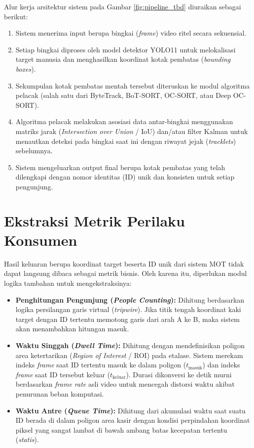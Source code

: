 Alur kerja arsitektur sistem pada Gambar \ref{fig:pipeline_tbd} diuraikan sebagai berikut:
\begin{enumerate}
    \item Sistem menerima input berupa bingkai (\textit{frame}) video ritel secara sekuensial.
    \item Setiap bingkai diproses oleh model detektor YOLO11 untuk melokalisasi target manusia dan menghasilkan koordinat kotak pembatas (\textit{bounding boxes}).
    \item Sekumpulan kotak pembatas mentah tersebut diteruskan ke modul algoritma pelacak (salah satu dari ByteTrack, BoT-SORT, OC-SORT, atau Deep OC-SORT).
    \item Algoritma pelacak melakukan asosiasi data antar-bingkai menggunakan matriks jarak (\textit{Intersection over Union} / IoU) dan/atau filter Kalman untuk menautkan deteksi pada bingkai saat ini dengan riwayat jejak (\textit{tracklets}) sebelumnya.
    \item Sistem mengeluarkan output final berupa kotak pembatas yang telah dilengkapi dengan nomor identitas (ID) unik dan konsisten untuk setiap pengunjung.
\end{enumerate}

\section{Ekstraksi Metrik Perilaku Konsumen}

Hasil keluaran berupa koordinat target beserta ID unik dari sistem MOT tidak dapat langsung dibaca sebagai metrik bisnis. Oleh karena itu, diperlukan modul logika tambahan untuk mengekstraksinya:
\begin{itemize}
    \item \textbf{Penghitungan Pengunjung (\textit{People Counting}):} Dihitung berdasarkan logika persilangan garis virtual (\textit{tripwire}). Jika titik tengah koordinat kaki target dengan ID tertentu memotong garis dari arah A ke B, maka sistem akan menambahkan hitungan masuk.
    \item \textbf{Waktu Singgah (\textit{Dwell Time}):} Dihitung dengan mendefinisikan poligon area ketertarikan (\textit{Region of Interest} / ROI) pada etalase. Sistem merekam indeks \textit{frame} saat ID tertentu masuk ke dalam poligon ($t_{\text{masuk}}$) dan indeks \textit{frame} saat ID tersebut keluar ($t_{\text{keluar}}$). Durasi dikonversi ke detik murni berdasarkan \textit{frame rate} asli video untuk mencegah distorsi waktu akibat penurunan beban komputasi.
    \item \textbf{Waktu Antre (\textit{Queue Time}):} Dihitung dari akumulasi waktu saat suatu ID berada di dalam poligon area kasir dengan kondisi perpindahan koordinat piksel yang sangat lambat di bawah ambang batas kecepatan tertentu (\textit{statis}).
\end{itemize}

